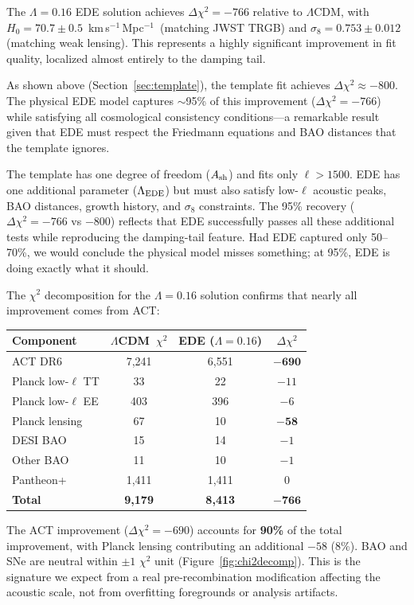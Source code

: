 \documentclass[twocolumn,showpacs,preprintnumbers,amsmath,amssymb,prd]{revtex4-2}
\newcommand{\lcdm}{$\Lambda$CDM}
\newcommand{\kms}{km\,s$^{-1}$\,Mpc$^{-1}$}
\begin{document}
The $\Lambda = 0.16$ EDE solution achieves $\Delta\chi^2 = -766$ relative to \lcdm, 
with $H_0 = 70.7 \pm 0.5$~\kms\ (matching JWST TRGB) and $\sigma_8 = 0.753 \pm 0.012$ 
(matching weak lensing). This represents a highly significant improvement in fit quality, 
localized almost entirely to the damping tail.

As shown above (Section~\ref{sec:template}), the template fit achieves 
$\Delta\chi^2 \approx -800$. The physical EDE model captures $\sim$95\% of this 
improvement ($\Delta\chi^2 = -766$) while satisfying all cosmological consistency 
conditions---a remarkable result given that EDE must respect the Friedmann 
equations and BAO distances that the template ignores.

The template has one degree of freedom ($A_{\rm sh}$) and fits only $\ell > 1500$. 
EDE has one additional parameter ($\Lambda_{\rm EDE}$) but must also satisfy 
low-$\ell$ acoustic peaks, BAO distances, growth history, and $\sigma_8$ constraints. 
The 95\% recovery ($\Delta\chi^2 = -766$ vs $-800$) reflects that EDE successfully 
passes all these additional tests while reproducing the damping-tail feature. 
Had EDE captured only 50--70\%, we would conclude the physical model misses 
something; at 95\%, EDE is doing exactly what it should.

The $\chi^2$ decomposition for the $\Lambda = 0.16$ solution confirms that nearly 
all improvement comes from ACT:
\begin{center}
\begin{tabular}{lccc}
\toprule
Component & \lcdm\ $\chi^2$ & EDE ($\Lambda = 0.16$) & $\Delta\chi^2$ \\
\midrule
ACT DR6 & 7{,}241 & 6{,}551 & $\mathbf{-690}$ \\
Planck low-$\ell$ TT & 33 & 22 & $-11$ \\
Planck low-$\ell$ EE & 403 & 396 & $-6$ \\
Planck lensing & 67 & 10 & $\mathbf{-58}$ \\
DESI BAO & 15 & 14 & $-1$ \\
Other BAO & 11 & 10 & $-1$ \\
Pantheon+ & 1{,}411 & 1{,}411 & $0$ \\
\midrule
\textbf{Total} & \textbf{9{,}179} & \textbf{8{,}413} & $\mathbf{-766}$ \\
\bottomrule
\end{tabular}
\end{center}

The ACT improvement ($\Delta\chi^2 = -690$) accounts for \textbf{90\%} of the 
total improvement, with Planck lensing contributing an additional $-58$ (8\%). 
BAO and SNe are neutral within $\pm 1$ $\chi^2$ unit
(Figure~\ref{fig:chi2decomp}). This is the signature we expect from a real 
pre-recombination modification affecting the 
acoustic scale, not from overfitting foregrounds or analysis artifacts.
\end{document}
